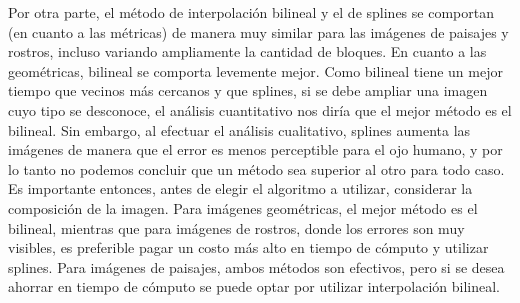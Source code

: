\documentclass{article}
\begin{document}
Por otra parte, el método de interpolación bilineal y el de splines se comportan (en cuanto a las métricas) de manera muy similar para las imágenes de paisajes y rostros, incluso variando ampliamente la cantidad de bloques. En cuanto a las geométricas, bilineal se comporta levemente mejor. Como bilineal tiene un mejor tiempo que vecinos más cercanos y que splines, si se debe ampliar una imagen cuyo tipo se desconoce, el análisis cuantitativo nos diría que el mejor método es el bilineal. Sin embargo, al efectuar el análisis cualitativo, splines aumenta las imágenes de manera que el error es menos perceptible para el ojo humano, y por lo tanto no podemos concluir que un método sea superior al otro para todo caso. Es importante entonces, antes de elegir el algoritmo a utilizar, considerar la composición de la imagen. Para imágenes geométricas, el mejor método es el bilineal, mientras que para imágenes de rostros, donde los errores son muy visibles, es preferible pagar un costo más alto en tiempo de cómputo y utilizar splines. Para imágenes de paisajes, ambos métodos son efectivos, pero si se desea ahorrar en tiempo de cómputo se puede optar por utilizar interpolación bilineal.
\end{document}
